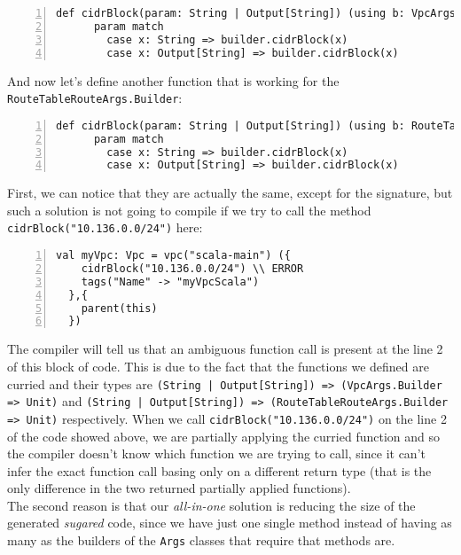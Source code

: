 \begin{minipage}{\linewidth}
\begin{lstlisting}[numbers=left, numberstyle=\tiny, numbersep=-5pt, stepnumber=1, linewidth=420pt]
  def cidrBlock(param: String | Output[String]) (using b: VpcArgs.Builder): Unit =
      param match
        case x: String => builder.cidrBlock(x)
        case x: Output[String] => builder.cidrBlock(x)
\end{lstlisting}
\end{minipage}
And now let's define another function that is working for the \texttt{RouteTableRouteArgs.Builder}:\\
\begin{minipage}{\linewidth}
\begin{lstlisting}[numbers=left, numberstyle=\tiny, numbersep=-5pt, stepnumber=1, linewidth=420pt]
  def cidrBlock(param: String | Output[String]) (using b: RouteTableRouteArgs.Builder): Unit =
      param match
        case x: String => builder.cidrBlock(x)
        case x: Output[String] => builder.cidrBlock(x)
\end{lstlisting}
\end{minipage}
First, we can notice that they are actually the same, except for the signature, but such a solution is not going to compile if we try to call the method \texttt{cidrBlock("10.136.0.0/24")} here:\\
\begin{minipage}{\linewidth}
\begin{lstlisting}[numbers=left, numberstyle=\tiny, numbersep=-5pt, stepnumber=1, linewidth=420pt]
  val myVpc: Vpc = vpc("scala-main") ({
    cidrBlock("10.136.0.0/24") \\ ERROR
    tags("Name" -> "myVpcScala")
  },{
    parent(this)
  })
\end{lstlisting}
\end{minipage}
The compiler will tell us that an ambiguous function call is present at the line 2 of this block of code.
This is due to the fact that the functions we defined are curried and their types are \texttt{(String | Output[String]) => (VpcArgs.Builder => Unit)} and \texttt{(String | Output[String]) => (RouteTableRouteArgs.Builder => Unit)} respectively.
When we call \texttt{cidrBlock("10.136.0.0/24")} on the line 2 of the code showed above, we are partially applying the curried function and so the compiler doesn't know which function we are trying to call, since it can't infer the exact function call basing only on a different return type (that is the only difference in the two returned partially applied functions).\\
The second reason is that our \textit{all-in-one} solution is reducing the size of the generated \textit{sugared} code, since we have just one single method instead of having as many as the builders of the \texttt{Args} classes that require that methods are.\\

